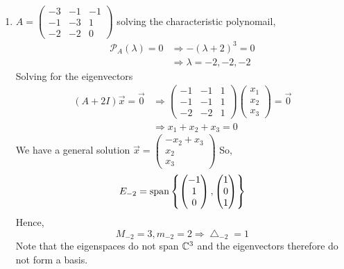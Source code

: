 \documentclass{article}
\numberwithin{equation}{section}
\begin{document}
\begin{eg}
\begin{enumerate}
        \item $A = \begin{pmatrix}
            -3 & -1 & -1 \\
            -1 & -3 & 1 \\
            -2 & -2 & 0
        \end{pmatrix}$ solving the characteristic polynomail,
        \begin{align*}
            \mathcal{P} _A(\lambda) = 0 &\Rightarrow - (\lambda + 2)^3 = 0 \\
            &\Rightarrow \lambda = -2, -2, -2
        \end{align*}
        Solving for the eigenvectors
        \begin{align*}
            (A + 2I)\vec x = \vec 0 &\Rightarrow \begin{pmatrix}
                -1 & -1 & 1 \\
                -1 & -1 & 1 \\
                -2 & -2 & 1
            \end{pmatrix}
            \begin{pmatrix}
                x_1 \\ x_2 \\ x_3
            \end{pmatrix} = \vec 0 \\
            &\Rightarrow x_1 + x_2 + x_3 = 0
        \end{align*}
        We have a general solution $\vec x = \begin{pmatrix}
            -x_2 + x_3 \\
            x_2 \\
            x_3
        \end{pmatrix}$
        So, 
        \[
            E_{-2} = \operatorname{span} \left\{ 
                \begin{pmatrix}
                    -1 \\ 1 \\ 0
                \end{pmatrix},                
                \begin{pmatrix}
                    1 \\ 0 \\ 1
                \end{pmatrix}
             \right\}  
        \]
        Hence,
        \[
            M_{-2} = 3, m_{-2} = 2 \Rightarrow \bigtriangleup_{-2} = 1
        \]
        Note that the eigenspaces do not span $\mathbb{C}^3$ and the eigenvectors therefore do not form a basis.


\end{enumerate}
\end{eg}
\end{document}
